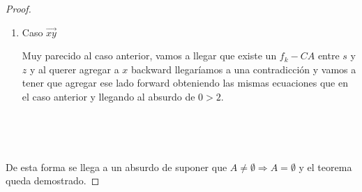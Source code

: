 \documentclass[11pt]{article}
\begin{document}
\begin{proof}
\begin{enumerate}
\item Caso $\overrightarrow{xy}$\par
Muy parecido al caso anterior, vamos a llegar que existe un $f_k-CA$ entre $s$ y $z$ y al querer agregar a $x$ backward llegaríamos a una contradicción y vamos a tener que agregar ese lado forward obteniendo las mismas ecuaciones que en el caso anterior y llegando al absurdo de $0>2$.\par
\

\end{enumerate}\par
\

De esta forma se llega a un absurdo de suponer que $A \ne \emptyset \Rightarrow A = \emptyset$ y el teorema queda demostrado.

\end{proof}
\end{document}
